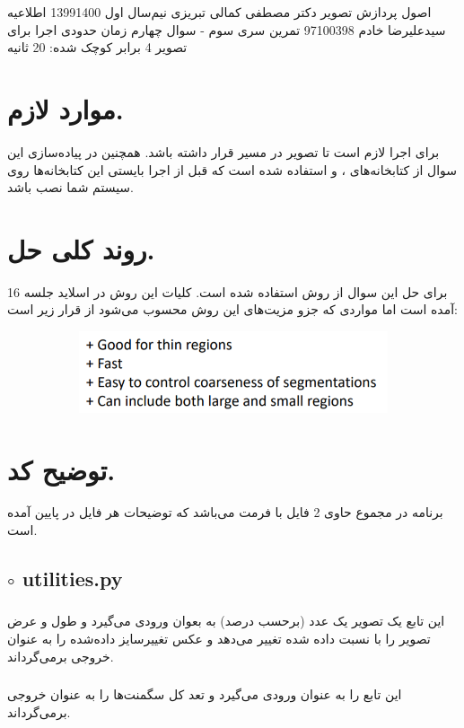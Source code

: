 \documentclass[a4paper,12pt]{article}
\begin{document}
	\handout
	{اصول پردازش تصویر}
	{دکتر مصطفی کمالی تبریزی}
	{نیم‌سال اول 1399\lr{-}1400}
	{اطلاعیه}
	{سیدعلیرضا خادم}
	{97100398}
	{تمرین سری سوم - سوال چهارم}
	زمان حدودی اجرا برای تصویر 4 برابر کوچک شده: 20 ثانیه
	\section*{موارد لازم.}
	برای اجرا لازم است تا تصویر
	در مسیر
	قرار داشته باشد. همچنین در پیاده‌سازی این سوال از کتابخانه‌های 
	،
	و
	استفاده شده است که قبل از اجرا بایستی این کتابخانه‌ها روی سیستم شما نصب باشد.
	\section*{روند کلی حل.}
برای حل این سوال از روش 
استفاده شده است. کلیات این روش در اسلاید جلسه 16 آمده است اما مواردی که جزو مزیت‌های این روش محسوب می‌شود از قرار زیر است:
\begin{figure}[H]
	\centering
	\begin{subfigure}{0.6\textwidth}
		\centering
		\includegraphics[width=\textwidth]{1.png}
	\end{subfigure}
\end{figure} 
	\section*{توضیح کد.}
	برنامه در مجموع حاوی 2 فایل با فرمت
	می‌باشد که توضیحات هر فایل در پایین آمده است.
	\subsection*{$\circ$ utilities.py}
	\subsubsection*{}
	این  تابع یک تصویر یک عدد (‌برحسب درصد) به بعوان ورودی می‌گیرد و طول و عرض تصویر را با نسبت داده شده تغییر می‌دهد و عکس تغییرسایز داده‌شده را به عنوان خروجی بر‌می‌گرداند.
	\subsubsection*{}
	این تابع 
	را به عنوان ورودی می‌گیرد و تعد کل سگمنت‌ها را به عنوان خروجی بر‌می‌گرداند.
\end{document}
